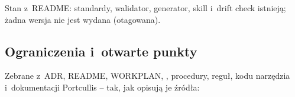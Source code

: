 Stan z~README: standardy, walidator, generator, skill i~drift check istnieją; żadna wersja
nie jest wydana (otagowana).


\subsection{Ograniczenia i~otwarte punkty}\label{sec:standardy-ograniczenia}

Zebrane z~ADR, README, WORKPLAN, , procedury, reguł, kodu narzędzia
i~dokumentacji Portcullis -- tak, jak opisują je źródła:

